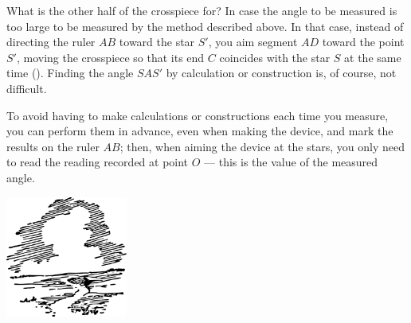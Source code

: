 What is the other half of the crosspiece for? In case the angle to be measured is too large to be measured by the method described above. In that case, instead of directing the ruler $AB$ toward the star $S'$, you aim segment $AD$ toward the point $S'$, moving the crosspiece so that its end $C$ coincides with the star $S$ at the same time (). Finding the angle $SAS'$ by calculation or construction is, of course, not difficult.

To avoid having to make calculations or constructions each time you measure, you can perform them in advance, even when making the device, and mark the results on the ruler $AB$; then, when aiming the device at the stars, you only need to read the reading recorded at point $O$ — this is the value of the measured angle.


\begin{center}
\includegraphics[width=0.3\textwidth]{figures/ch-03/fig-ch-03-tail.pdf}
\end{center}


















